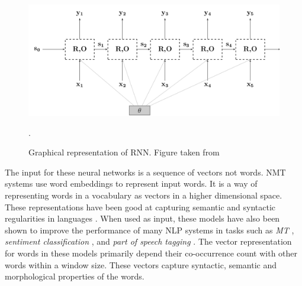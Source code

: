 \begin{figure}[ht]
	\centering
	\includegraphics[scale=0.3]{images/rnn}
	\caption{Graphical representation of RNN. Figure taken from \cite{goldberg2016primer}}.
	\label{rnn}
\end{figure}


The input for these neural networks is a sequence of vectors not words. NMT systems use word embeddings to represent input words. It is a way of representing words in a vocabulary as vectors in a higher dimensional space. These representations have been good at capturing semantic and syntactic regularities in languages \citep{mikolov2013distributed}. When used as input, these models have also been shown to improve the performance of many NLP systems in tasks such as \textit{MT} \citep{vaswani2017attention, sennrich2015neural}, \textit{sentiment classification} \citep{kumar2016ask}, and \textit{part of speech tagging} \citep{kumar2016ask}. The vector representation for words in these models primarily depend their co-occurrence count with other words within a window size. These vectors capture syntactic, semantic and morphological properties of the words. 




